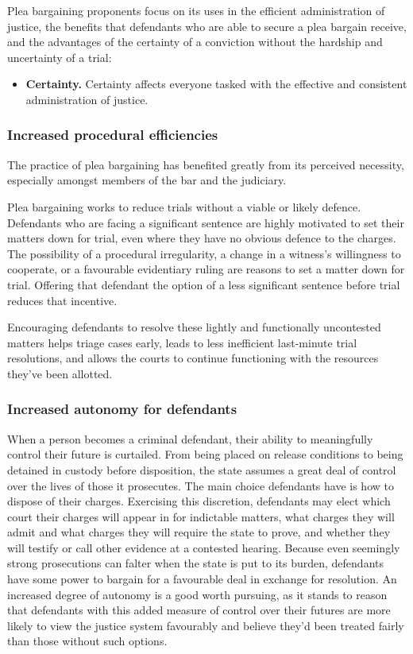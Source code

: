 Plea bargaining proponents focus on its uses in the efficient administration of justice, the benefits that defendants who are able to secure a plea bargain receive, and the advantages of the certainty of a conviction without the hardship and uncertainty of a trial:

\begin{itemize}
\item \textbf{Certainty.} Certainty affects everyone tasked with the effective and consistent administration of justice.
\end{itemize}

\subsubsection{Increased procedural efficiencies}

The practice of plea bargaining has benefited greatly from its perceived necessity, especially amongst members of the bar and the judiciary.



Plea bargaining works to reduce trials without a viable or likely defence. Defendants who are facing a significant sentence are highly motivated to set their matters down for trial, even where they have no obvious defence to the charges. The possibility of a procedural irregularity, a change in a witness's willingness to cooperate, or a favourable evidentiary ruling are reasons to set a matter down for trial. Offering that defendant the option of a less significant sentence before trial reduces that incentive.

Encouraging defendants to resolve these lightly and functionally uncontested matters helps triage cases early, leads to less inefficient last-minute trial resolutions, and allows the courts to continue functioning with the resources they've been allotted. 

\subsubsection{Increased autonomy for defendants}

When a person becomes a criminal defendant, their ability to meaningfully control their future is curtailed. From being placed on release conditions to being detained in custody before disposition, the state assumes a great deal of control over the lives of those it prosecutes. The main choice defendants have is how to dispose of their charges. Exercising this discretion, defendants may elect which court their charges will appear in for indictable matters, what charges they will admit and what charges they will require the state to prove, and whether they will testify or call other evidence at a contested hearing. Because even seemingly strong prosecutions can falter when the state is put to its burden, defendants have some power to bargain for a favourable deal in exchange for resolution. An increased degree of autonomy is a good worth pursuing, as it stands to reason that defendants with this added measure of control over their futures are more likely to view the justice system favourably and believe they'd been treated fairly than those without such options.

